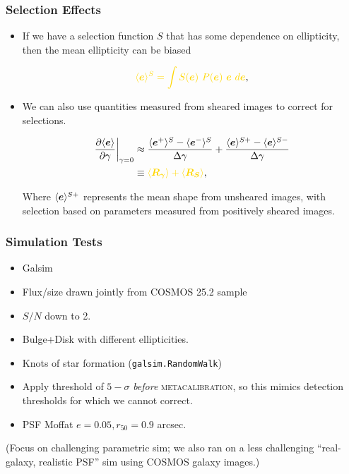 \documentclass{beamer}
\newcommand{\mcal}{\textsc{metacalibration}}
\newcommand{\mcalRg}{\mbox{\boldmath $R_\gamma$}}
\newcommand{\mcalRS}{\mbox{\boldmath $R_S$}}
\newcommand{\vest}{\mbox{\boldmath $e$}}
\begin{document}
\frame
{
    \frametitle{Selection Effects}

 
    \begin{itemize}

        \item If we have a selection function $S$ that has some dependence
            on ellipticity, then the mean ellipticity
            can be biased

            \begin{align}
                {\color{gold} \langle \vest \rangle^S = \int S(\vest)~P(\vest)~\vest~d\vest},
            \end{align}


        \item We can also use quantities measured from sheared images
            to correct for selections. 

            \begin{align}
                \frac{\partial \langle \vest \rangle}{\partial \gamma}\bigg|_{\gamma=0} &\approx
                \frac{\langle \vest^+ \rangle^S - \langle \vest^- \rangle^S}{\Delta \gamma} + \frac{\langle \vest \rangle^{S+} - \langle \vest \rangle^{S-}}{\Delta \gamma} \nonumber \\
                &\equiv {\color{gold} \langle \mcalRg \rangle + \langle \mcalRS \rangle},
            \end{align}

            Where {\color{lightsteelblue} $\langle \vest \rangle^{S+}$}
            represents the mean shape from unsheared images, with selection
            based on parameters measured from
            positively sheared images.

    \end{itemize}

}

\frame
{

    \frametitle{Simulation Tests}


    \begin{itemize}
        \item Galsim
        \item Flux/size drawn jointly from COSMOS 25.2 sample
        \item $S/N$ down to 2.
        \item Bulge+Disk with different ellipticities.
        \item Knots of star formation (\texttt{galsim.RandomWalk})
        \item Apply threshold of $5-\sigma$ {\em before} \mcal, so this
            mimics detection thresholds for which we cannot correct.
        \item PSF Moffat $e=0.05, r_{50} = 0.9$ arcsec.
    \end{itemize}

    (Focus on challenging parametric sim; we also ran on a less challenging 
    ``real-galaxy, realistic PSF'' sim using COSMOS galaxy images.)

}
\end{document}
